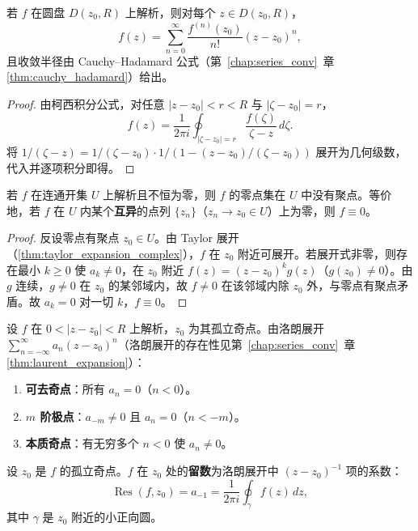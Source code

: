 \begin{theorem}\label{thm:taylor_expansion_complex}
若 $f$ 在圆盘 $D(z_0, R)$ 上解析，则对每个 $z \in D(z_0, R)$，
\[
f(z) = \sum_{n=0}^{\infty} \frac{f^{(n)}(z_0)}{n!}(z-z_0)^n,
\]
且收敛半径由 Cauchy–Hadamard 公式（第~\ref{chap:series_conv}~章 \cref{thm:cauchy_hadamard}）给出。
\end{theorem}

\begin{proof}
由柯西积分公式，对任意 $|z - z_0| < r < R$ 与 $|\zeta - z_0| = r$，
\[
f(z) = \frac{1}{2\pi i} \oint_{|\zeta - z_0| = r} \frac{f(\zeta)}{\zeta - z}\,d\zeta.
\]
将 $1/(\zeta - z) = 1/(\zeta - z_0) \cdot 1/(1 - (z - z_0)/(\zeta - z_0))$ 展开为几何级数，代入并逐项积分即得。
\end{proof}

\begin{corollary}[解析函数的零点孤立性]\label{cor:zero_isolated}
若 $f$ 在连通开集 $U$ 上解析且不恒为零，则 $f$ 的零点集在 $U$ 中没有聚点。等价地，若 $f$ 在 $U$ 内某个\textbf{互异}的点列 $\{z_n\}$（$z_n \to z_0 \in U$）上为零，则 $f \equiv 0$。
\end{corollary}

\begin{proof}
反设零点有聚点 $z_0 \in U$。由 Taylor 展开（\cref{thm:taylor_expansion_complex}），$f$ 在 $z_0$ 附近可展开。若展开式非零，则存在最小 $k \ge 0$ 使 $a_k \ne 0$，在 $z_0$ 附近 $f(z) = (z-z_0)^k g(z)$（$g(z_0) \ne 0$）。由 $g$ 连续，$g \ne 0$ 在 $z_0$ 的某邻域内，故 $f \ne 0$ 在该邻域内除 $z_0$ 外，与零点有聚点矛盾。故 $a_k = 0$ 对一切 $k$，$f \equiv 0$。
\end{proof}

\begin{definition}[孤立奇点的分类]\label{def:singularity_types}
设 $f$ 在 $0 < |z-z_0| < R$ 上解析，$z_0$ 为其孤立奇点。由洛朗展开 $\sum_{n=-\infty}^{\infty} a_n (z-z_0)^n$（洛朗展开的存在性见第~\ref{chap:series_conv}~章 \cref{thm:laurent_expansion}）：
\begin{enumerate}[label=(\roman*)]
    \item \textbf{可去奇点}：所有 $a_n = 0$（$n < 0$）。
    \item \textbf{$m$ 阶极点}：$a_{-m} \neq 0$ 且 $a_n = 0$（$n < -m$）。
    \item \textbf{本质奇点}：有无穷多个 $n < 0$ 使 $a_n \neq 0$。
\end{enumerate}
\end{definition}

\begin{definition}[留数]\label{def:residue}
设 $z_0$ 是 $f$ 的孤立奇点。$f$ 在 $z_0$ 处的\textbf{留数}为洛朗展开中 $(z-z_0)^{-1}$ 项的系数：
\[
\operatorname{Res}(f, z_0) = a_{-1} = \frac{1}{2\pi i} \oint_\gamma f(z)\,dz,
\]
其中 $\gamma$ 是 $z_0$ 附近的小正向圆。
\end{definition}

